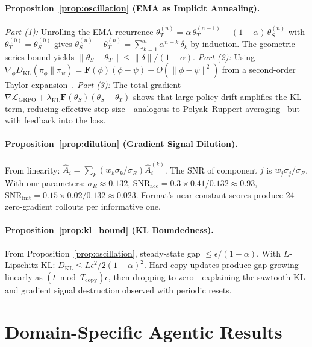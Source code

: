 \documentclass{article}
\begin{document}
\paragraph{Proposition~\ref{prop:oscillation} (EMA as Implicit Annealing).}
\emph{Part (1):} Unrolling the EMA recurrence $\theta_T^{(n)} = \alpha\,\theta_T^{(n-1)} + (1-\alpha)\,\theta_S^{(n)}$ with $\theta_T^{(0)} = \theta_S^{(0)}$ gives $\theta_S^{(n)} - \theta_T^{(n)} = \sum_{k=1}^n \alpha^{n-k}\,\delta_k$ by induction. The geometric series bound yields $\|\theta_S - \theta_T\| \leq \|\delta\|/(1-\alpha)$.
\emph{Part (2):} Using $\nabla_\phi D_{\mathrm{KL}}(\pi_\phi \| \pi_\psi) = \mathbf{F}(\phi)(\phi - \psi) + O(\|\phi - \psi\|^2)$ from a second-order Taylor expansion~\citep{amari1998natural}.
\emph{Part (3):} The total gradient $\nabla \mathcal{L}_{\mathrm{GRPO}} + \lambda_{\mathrm{KL}}\mathbf{F}(\theta_S)(\theta_S - \theta_T)$ shows that large policy drift amplifies the KL term, reducing effective step size---analogous to Polyak--Ruppert averaging~\citep{polyak1992acceleration} but with feedback into the loss.

\paragraph{Proposition~\ref{prop:dilution} (Gradient Signal Dilution).}
From linearity: $\hat{A}_i = \sum_k (w_k \sigma_k/\sigma_R)\hat{A}_i^{(k)}$. The SNR of component $j$ is $w_j\sigma_j/\sigma_R$. With our parameters: $\sigma_R \approx 0.132$, $\mathrm{SNR}_\mathrm{acc} = 0.3 \times 0.41/0.132 \approx 0.93$, $\mathrm{SNR}_\mathrm{fmt} = 0.15 \times 0.02/0.132 \approx 0.023$. Format's near-constant scores produce 24 zero-gradient rollouts per informative one.

\paragraph{Proposition~\ref{prop:kl_bound} (KL Boundedness).}
From Proposition~\ref{prop:oscillation}, steady-state gap $\leq \epsilon/(1-\alpha)$. With $L$-Lipschitz KL: $D_{\mathrm{KL}} \leq L\epsilon^2/2(1-\alpha)^2$. Hard-copy updates produce gap growing linearly as $(t \bmod T_\text{copy})\epsilon$, then dropping to zero---explaining the sawtooth KL and gradient signal destruction observed with periodic resets.


\section{Domain-Specific Agentic Results}
\label{app:domain_results}
\end{document}
